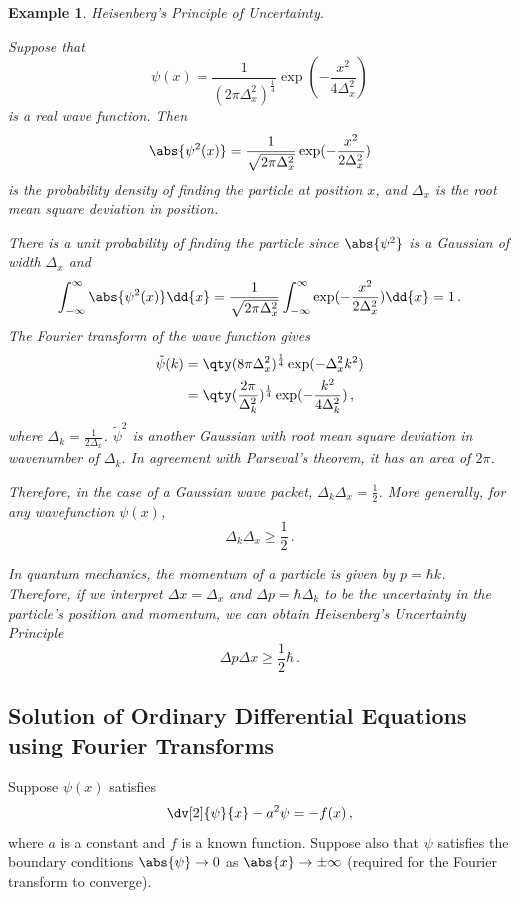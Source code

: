\documentclass{article}
\theoremstyle{plain}\theoremheaderfont{\normalfont\itshape}\theorembodyfont{\rmfamily}\theoremseparator{.}\newtheorem*{rem}{Remark}\newtheorem*{ex}{Example}\newtheorem*{proof}{Proof}\newtheorem*{altp}{Alternative proof}
\theoremstyle{plain}\theoremheaderfont{\normalfont\bfseries}\theorembodyfont{\rmfamily}\theoremseparator{.}\newtheorem{thm}{Theorem}[section]\newtheorem{lem}[thm]{Lemma}\newtheorem{prop}[thm]{Proposition}\newtheorem*{cor}{Corollary}\newtheorem{defn}[thm]{Definition}\newtheorem{clm}[thm]{Claim}\newtheorem{clminproof}{Claim}
\theoremstyle{break}\theoremheaderfont{\normalfont\itshape}\theorembodyfont{\rmfamily}\theoremseparator{.\medskip}\newtheorem*{proofskip}{Proof}\newtheorem*{exs}{Examples}\newtheorem*{rems}{Remarks}
\theoremstyle{break}\theoremheaderfont{\normalfont\bfseries}\theorembodyfont{\rmfamily}\theoremseparator{.\medskip}\newtheorem{lemskip}[thm]{Lemma}\newtheorem{defnskip}[thm]{Definition}\newtheorem{propskip}[thm]{Proposition}\newtheorem{thmskip}[thm]{Theorem}
\numberwithin{equation}{section}
\begin{document}
	\begin{ex}
		\textit{Heisenberg's Principle of Uncertainty.}
		
		Suppose that
		\[\psi(x)=\frac{1}{(2\pi\Delta_x^2)^\frac{1}{4}}\exp(-\frac{x^2}{4\Delta_x^2})\]
		is a real wave function. Then
		\[\abs{\psi^2(x)}=\frac{1}{\sqrt{2\pi\Delta_x^2}}\exp(-\frac{x^2}{2\Delta_x^2})\]
		is the probability density of finding the particle at position \(x\), and \(\Delta_x\) is the root mean square deviation in position.
		
		There is a unit probability of finding the particle since \(\abs{\psi^2}\) is a Gaussian of width \(\Delta_x\) and
		\[\int_{-\infty}^{\infty}\abs{\psi^2(x)}\dd{x}=\frac{1}{\sqrt{2\pi\Delta_x^2}}\int_{-\infty}^{\infty}\exp(-\frac{x^2}{2\Delta_x^2})\dd{x}=1\,.\]
		The Fourier transform of the wave function gives
		\begin{align*}
			\tilde{\psi}(k)&=\qty(8\pi\Delta_x^2)^{\frac{1}{4}}\exp(-\Delta_x^2 k^2)\\
			&=\qty(\frac{2\pi}{\Delta_k^2})^\frac{1}{4}\exp(-\frac{k^2}{4\Delta_k^2})\,,
		\end{align*}
		where \(\Delta_k=\frac{1}{2\Delta_x}\). \(\tilde{\psi}^2\) is another Gaussian with root mean square deviation in wavenumber of \(\Delta_k\). In agreement with Parseval's theorem, it has an area of \(2\pi\).
		
		Therefore, in the case of a Gaussian wave packet, \(\Delta_k\Delta_x=\frac{1}{2}\). More generally, for any wavefunction \(\psi(x)\),
		\[\Delta_k\Delta_x\ge\frac{1}{2}\,.\]
		
		In quantum mechanics, the momentum of a particle is given by \(p=\hbar k\). Therefore, if we interpret \(\Delta x=\Delta_x\) and \(\Delta p=\hbar\Delta_k\) to be the uncertainty in the particle's position and momentum, we can obtain Heisenberg's Uncertainty Principle
		\[\Delta p\Delta x\ge\frac{1}{2}\hbar\,.\]
	\end{ex}
	
	\subsection{Solution of Ordinary Differential Equations using Fourier Transforms}
	Suppose \(\psi(x)\) satisfies
	\[\dv[2]{\psi}{x}-a^2\psi=-f(x)\,,\]
	where \(a\) is a constant and \(f\) is a known function. Suppose also that \(\psi\) satisfies the boundary conditions \(\abs{\psi}\to 0\) as \(\abs{x}\to\pm\infty\) (required for the Fourier transform to converge).
	
\end{document}
